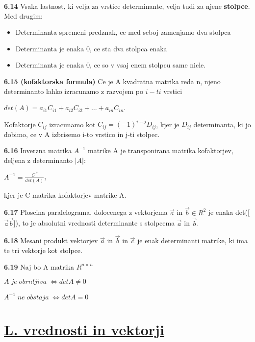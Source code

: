 \documentclass{article}
\begin{document}
\begin{multicols}{4}
\textbf{6.14} Vsaka lastnost, ki velja za vrstice determinante, velja tudi
za njene \textbf{stolpce}. Med drugim:
\begin{itemize}
    \item Determinanta spremeni predznak, ce med seboj zamenjamo dva stolpca
    \item Determinanta je enaka 0, ce sta dva stolpca enaka
    \item Determinanta je enaka 0, ce so v vsaj enem stolpcu same nicle.
\end{itemize}

\textbf{6.15 (kofaktorska formula)} Ce je A kvadratna matrika reda n,
njeno determinanto lahko izracunamo z razvojem po $i-ti$ vrstici
\begin{center}
    $det(A) = a_{i1}C_{i1} + a_{i2}C_{i2} + \hdots + a_{in}C_{in}$.
\end{center}
Kofaktorje $C_{ij}$ izracunamo kot $C_{ij} = (-1)^{i+j}D_{ij}$, kjer je $D_{ij}$ determinanta,
ki jo dobimo, ce v A izbrisemo i-to vrstico in j-ti stolpec.

\textbf{6.16} Inverzna matrika $A^{-1}$ matrike A je transponirana matrika kofaktorjev,
deljena z determinanto $|A|$:
\begin{center}
    $A^{-1} = \frac{C^{T}}{det(A)}$,
\end{center}
kjer je C matrika kofaktorjev matrike A.

\textbf{6.17} Ploscina paralelograma, dolocenega z vektorjema $\vec{a}$ in $\vec{b} \in R^{2}$ je
enaka det([$\vec{a} \vec{b}$]), to je absolutni vrednosti determinante s stolpcema $\vec{a}$ in $\vec{b}$.

\textbf{6.18} Mesani produkt vektorjev $\vec{a}$ in $\vec{b}$ in $\vec{c}$ je enak determinanti matrike, ki 
ima te tri vektorje kot stolpce.

\textbf{6.19} Naj bo A matrika $R^{n\times n}$
\begin{center}
    \begin{math}
        A\; je\; obrnljiva\; \iff detA \neq 0
    \end{math}
\end{center}
\begin{center}
    \begin{math}
        A^{-1}\; ne\; obstaja\; \iff detA = 0
    \end{math}
\end{center}

\section{\underline{L. vrednosti in vektorji}}


\end{multicols}
\end{document}
